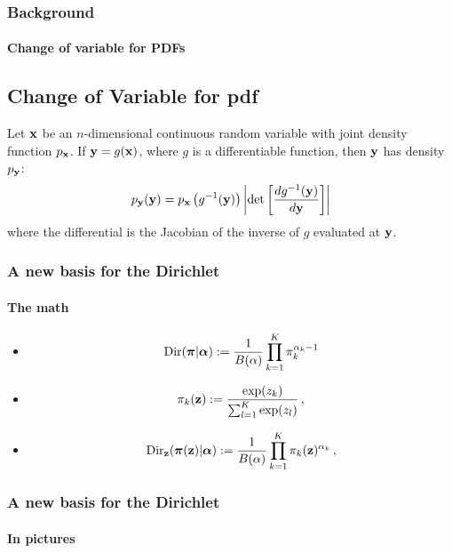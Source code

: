 \documentclass[10pt,usepdftitle=false,aspectratio=169,handout]{beamer}
\begin{document}

\begin{frame}\frametitle{Background}
    \framesubtitle{Change of variable for PDFs}
	\subsection*{Change of Variable for pdf} 
	Let ${\mathbf{x}}$ be an $n$-dimensional continuous random variable with joint density function $p_{\mathbf{x}}$. If ${\mathbf{y}} = g({\mathbf{x}})$, where $g$ is a differentiable function, then ${\mathbf{y}}$ has density $p_{\mathbf{y}}$:
	\begin{equation}
	p_{\mathbf{y}}(\mathbf{y}) = p_{\mathbf{x}}\left(g^{-1}(\mathbf{{\mathbf{y}}})\right)\left\vert \operatorname{det}\left[\frac{dg^{-1}(\mathbf{{\mathbf{y}}})}{d\mathbf{{\mathbf{y}}}} \right]\right \vert
	\end{equation}
	where the differential is the Jacobian of the inverse of $g$ evaluated at ${\mathbf{y}}$. 
\end{frame}


\begin{frame}\frametitle{A new basis for the Dirichlet}
	\framesubtitle{The math}
	\begin{itemize}
		\item \begin{equation}\label{eq:dirichlet}
		\mathrm{Dir}(\boldsymbol{\pi} | {\boldsymbol{\alpha}}) := \frac{1}{B(\alpha)}\prod_{k=1}^K \pi_k^{\alpha_k-1}
		\end{equation}
		\item \begin{equation}
		\pi_k(\mathbf{z}) := \frac{\exp(z_k)}{\sum_{l=1}^K \exp(z_l)} \, ,
		\end{equation}
		\item \begin{equation}\label{eq:dirichlet_softmax}
		\mathrm{Dir}_{\mathbf{z}}(\boldsymbol{\pi}(\mathbf{z}) | {\boldsymbol{\alpha}}) := \frac{1}{B(\alpha)}\prod_{k=1}^K \pi_k(\mathbf{z})^{\alpha_k} \, ,
		\end{equation}
	\end{itemize}
\end{frame}


\setlength{\figwidth}{0.5\textwidth}
\setlength{\figheight}{0.7\textheight}

\begin{frame}\frametitle{A new basis for the Dirichlet}
	\framesubtitle{In pictures}
	\begin{figure}
		\centering
		\scriptsize
		
	\end{figure}
\end{frame}
\end{document}
